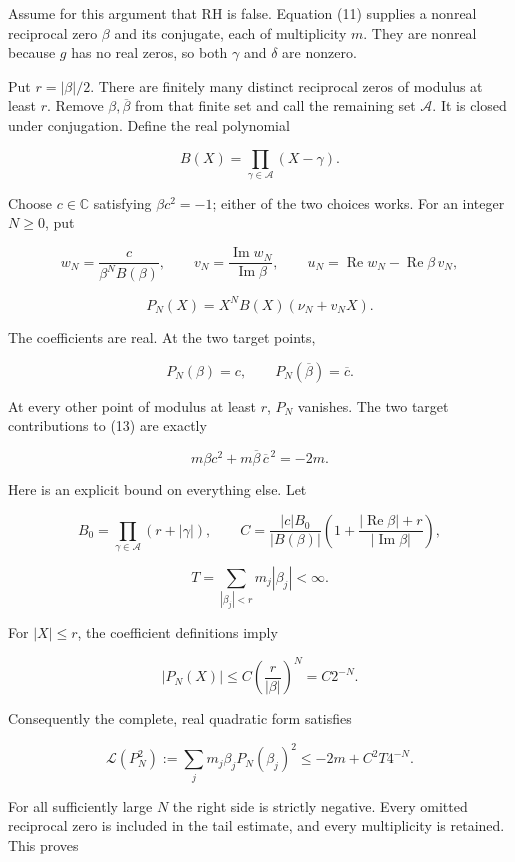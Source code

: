 \documentclass[
  11pt,
]{article}
\begin{document}
Assume for this argument that RH is false. Equation (11) supplies a
nonreal reciprocal zero \(\beta\) and its conjugate, each of
multiplicity \(m\). They are nonreal because \(g\) has no real zeros, so
both \(\gamma\) and \(\delta\) are nonzero.

Put \(r=|\beta|/2\). There are finitely many distinct reciprocal zeros
of modulus at least \(r\). Remove \(\beta,\overline\beta\) from that
finite set and call the remaining set \(\mathcal A\). It is closed under
conjugation. Define the real polynomial

\[
B(X)=\prod_{\gamma\in\mathcal A}(X-\gamma).
\tag{15}
\]

Choose \(c\in\mathbb C\) satisfying \(\beta c^2=-1\); either of the two
choices works. For an integer \(N\ge0\), put

\[
w_N=\frac{c}{\beta^NB(\beta)},\qquad
v_N=\frac{\operatorname{Im}w_N}{\operatorname{Im}\beta},\qquad
u_N=\operatorname{Re}w_N-\operatorname{Re}\beta\,v_N,
\]

\[
\boxed{P_N(X)=X^NB(X)(\nu_N+v_NX).}
\tag{16}
\]

The coefficients are real. At the two target points,

\[
P_N(\beta)=c,\qquad P_N(\overline\beta)=\overline c.
\]

At every other point of modulus at least \(r\), \(P_N\) vanishes. The
two target contributions to (13) are exactly

\[
m\beta c^2+m\overline\beta\,\overline c^{\,2}=-2m.
\tag{17}
\]

Here is an explicit bound on everything else. Let

\[
B_0=\prod_{\gamma\in\mathcal A}(r+|\gamma|),\qquad
C=\frac{|c|B_0}{|B(\beta)|}
\left(1+\frac{|\operatorname{Re}\beta|+r}{|\operatorname{Im}\beta|}\right),
\]

\[
T=\sum_{|\beta_j|<r}m_j|\beta_j|<\infty.
\]

For \(|X|\le r\), the coefficient definitions imply

\[
|P_N(X)|\le C\left(\frac r{|\beta|}\right)^N=C2^{-N}.
\]

Consequently the complete, real quadratic form satisfies

\[
\boxed{
\mathcal L(P_N^2)
:=\sum_jm_j\beta_jP_N(\beta_j)^2
\le -2m+C^2T4^{-N}.
}
\tag{18}
\]

For all sufficiently large \(N\) the right side is strictly negative.
Every omitted reciprocal zero is included in the tail estimate, and
every multiplicity is retained. This proves
\end{document}
